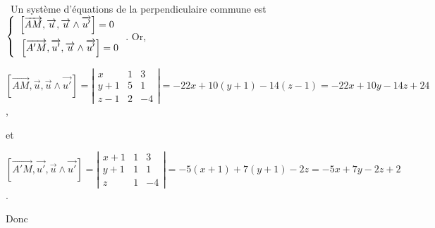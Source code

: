 {{\textbullet~Un système d'équations de la perpendiculaire commune est 
$\left\{
\begin{array}{l}
\left[\overrightarrow{AM},\overrightarrow{u},\overrightarrow{u}\wedge\overrightarrow{u'}\right]=0\\
\rule{0mm}{6mm}\left[\overrightarrow{A'M},\overrightarrow{u'},\overrightarrow{u}\wedge\overrightarrow{u'}\right]=0
\end{array}
\right.$. Or,

\begin{center}
$\left[\overrightarrow{AM},\overrightarrow{u},\overrightarrow{u}\wedge\overrightarrow{u'}\right]=\left|
\begin{array}{ccc}
x&1&3\\
y+1&5&1\\
z-1&2&-4
\end{array}
\right|=-22x+10(y+1)-14(z-1)=-22x+10y-14z+24$,
\end{center}
et

\begin{center}
$\left[\overrightarrow{A'M},\overrightarrow{u'},\overrightarrow{u}\wedge\overrightarrow{u'}\right]=\left|
\begin{array}{ccc}
x+1&1&3\\
y+1&1&1\\
z&1&-4
\end{array}
\right|=-5(x+1)+7(y+1)-2z=-5x+7y-2z+2$.
\end{center}
Donc

\begin{center}
\end{center}
}
}
